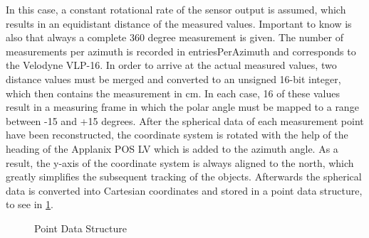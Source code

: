 \documentclass[11pt,oneside,openright]{mpreport}
\begin{document}
In this case, a constant rotational rate of the sensor output is assumed, which results in an equidistant distance of the measured values. Important to know is also 
that always a complete 360 degree measurement is given. The number of measurements per azimuth is recorded in 
entriesPerAzimuth and corresponds to the Velodyne VLP-16. In order to arrive at the actual measured values, two distance values must be merged and converted to an unsigned 16-bit integer,
which then contains the measurement in cm. In each case, 16 of these values result in a measuring frame in which the polar angle must be mapped to a range between -15 and +15 degrees.
After the spherical data of each measurement point have been reconstructed, the coordinate system is rotated with the help of the heading of the Applanix POS LV
which is added to the azimuth angle. As a result, the y-axis of the coordinate system is always aligned to the north, which greatly simplifies the subsequent tracking of the objects.
Afterwards the spherical data is converted into Cartesian coordinates and stored in a point data structure, to see in \cref{pcdc}.

\begin{figure}[!ht]
\caption{Point Data Structure}
  \begin{center}
  \end{center}
\label{pcdc}
\end{figure}
\end{document}

